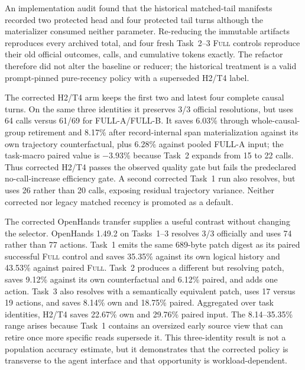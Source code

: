 \documentclass[11pt]{article}
\begin{document}
An implementation audit found that the historical matched-tail manifests
recorded two protected head and four protected tail turns although the
materializer consumed neither parameter.  Re-reducing the immutable artifacts
reproduces every archived total, and four fresh Task~2--3 \textsc{Full}
controls reproduce their old official outcomes, calls, and cumulative tokens
exactly.  The refactor therefore did not alter the baseline or reducer; the
historical treatment is a valid prompt-pinned pure-recency policy with a
superseded H2/T4 label.

The corrected H2/T4 arm keeps the first two and latest four complete causal
turns.  On the same three identities it preserves 3/3 official resolutions,
but uses 64 calls versus 61/69 for FULL-A/FULL-B.  It saves 6.03\% through
whole-causal-group retirement and 8.17\% after record-internal span
materialization against its own trajectory counterfactual, plus 6.28\%
against pooled FULL-A input; the
task-macro paired value is $-3.93$\% because Task~2 expands from 15 to 22
calls.  Thus corrected H2/T4 passes the observed quality gate but fails the
predeclared no-call-increase efficiency gate.  A second corrected Task~1 run
also resolves, but uses 26 rather than 20 calls, exposing residual trajectory
variance.  Neither corrected nor legacy matched recency is promoted as a
default.

The corrected OpenHands transfer supplies a useful contrast without changing
the selector.  OpenHands 1.49.2 on Tasks~1--3 resolves 3/3 officially and uses
74 rather than 77 actions.  Task~1 emits the same 689-byte patch digest as its
paired successful \textsc{Full} control and saves 35.35\% against its own
logical history and 43.53\% against paired \textsc{Full}.  Task~2 produces a
different but resolving patch, saves 9.12\% against its own counterfactual and
6.12\% paired, and adds one action.  Task~3 also resolves with a semantically
equivalent patch, uses 17 versus 19 actions, and saves 8.14\% own and 18.75\%
paired.  Aggregated over task identities, H2/T4 saves 22.67\% own and 29.76\%
paired input.  The 8.14--35.35\% range arises
because Task~1 contains an oversized early source view that can retire once
more specific reads supersede it.  This three-identity result is not a population
accuracy estimate, but it demonstrates that the corrected policy is transverse
to the agent interface and that opportunity is workload-dependent.
\end{document}
